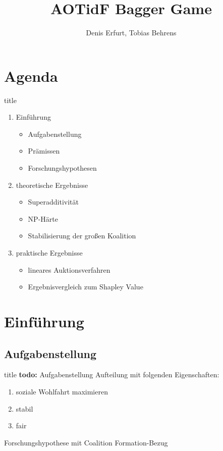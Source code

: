 \documentclass[c]{beamer}
\title[] {AOTidF Bagger Game}
\author[Denis Erfurt, Tobias Behrens] %
{Denis Erfurt, Tobias Behrens}
\newcommand\todo[1]{\colorbox{blue!15}{\textbf{todo: }#1}\newline}
\theoremstyle{break}
\begin{document}
  \frame{\titlepage} %
  
  \section*{Agenda}
  \begin{frame}{title} %
    \begin{enumerate}
      \item Einführung
      \begin{itemize}
        \item Aufgabenstellung
        \item Prämissen
        \item Forschungshypothesen
      \end{itemize}
      \item theoretische Ergebnisse
      \begin{itemize}
        \item Superadditivität
        \item NP-Härte
        \item Stabilisierung der großen Koalition
      \end{itemize}
      \item praktische Ergebnisse
      \begin{itemize}
        \item lineares Auktionsverfahren
        \item Ergebnisvergleich zum Shapley Value
      \end{itemize}
    \end{enumerate}
  \end{frame}
  
  
  \section*{Einführung}
  \subsection*{Aufgabenstellung}
  \begin{frame}{title} %
    \todo{Aufgabenstellung}
    Aufteilung mit folgenden Eigenschaften:
    \begin{enumerate}
      \item soziale Wohlfahrt maximieren
      \item stabil
      \item fair
    \end{enumerate}
    Forschungshypothese mit Coalition Formation-Bezug
  \end{frame}
\end{document}
